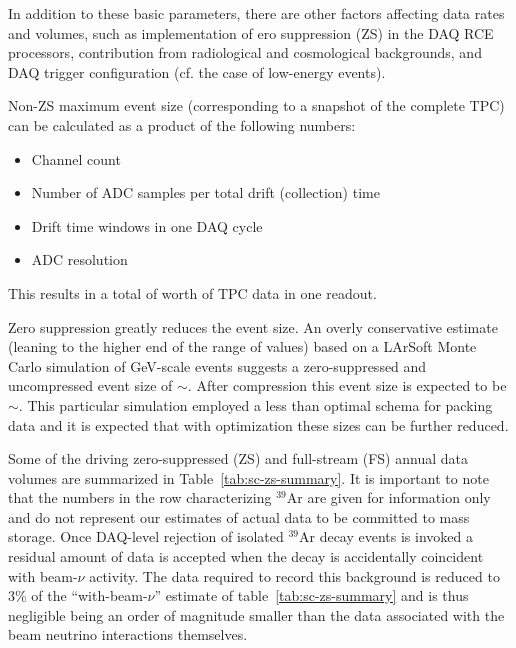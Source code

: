 In addition to these basic parameters, there are other factors
affecting data rates and volumes, such as implementation of ero
suppression (ZS) in the DAQ RCE processors,
contribution from radiological and cosmological backgrounds, and DAQ
trigger configuration (cf. the case of low-energy events).

Non-ZS maximum event size (corresponding to a snapshot of the complete
TPC) can be calculated as a product of the following numbers:
\begin{itemize}
\item Channel count
\item Number of ADC samples per total drift (collection) time
\item Drift time windows in one DAQ cycle
\item ADC resolution
\end{itemize}

This results in a total of \dunefsreadoutsize worth of TPC data in one
readout.

Zero suppression greatly reduces the event size.  An overly
conservative estimate (leaning to the higher end of the range of
values) based on a LArSoft Monte Carlo simulation of GeV-scale events
suggests a zero-suppressed and uncompressed event size of
$\sim$\beameventsize.  After compression this event size is expected
to be $\sim$\beameventsizecompressed.  This particular simulation
employed a less than optimal schema for packing data and it is
expected that with optimization these sizes can be further reduced.

Some of the driving zero-suppressed (ZS) and full-stream (FS) annual
data volumes are summarized in Table~\ref{tab:sc-zs-summary}. It is
important to note that the numbers in the row characterizing $^{39}$Ar
are given for information only and do not represent our estimates of
actual data to be committed to mass storage.
Once DAQ-level rejection of isolated $^{39}$Ar decay events is invoked
a residual amount of data is accepted when the decay is accidentally
coincident with beam-$\nu$ activity.
The data required to record this background is reduced to 3\% of the
``with-beam-$\nu$'' estimate of table~\ref{tab:sc-zs-summary} and is
thus negligible being an order of magnitude smaller than the data
associated with the beam neutrino interactions themselves.

